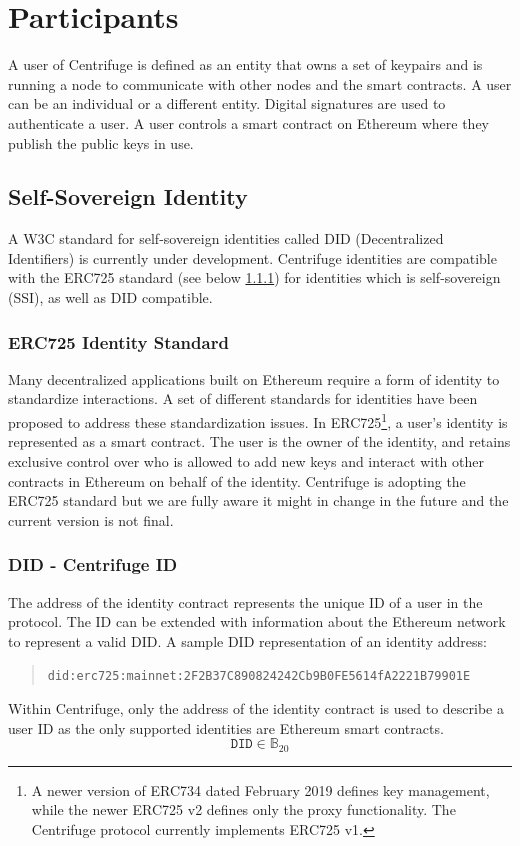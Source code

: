 \section{Participants}\label{sec:particpiants}
A user of Centrifuge is defined as an entity that owns a set of keypairs and is running a node to communicate with other nodes and the smart contracts. A user can be an individual or a different entity. Digital signatures are used to authenticate a user. A user controls a smart contract on Ethereum where they publish the public keys in use.

\subsection{Self-Sovereign Identity}\label{sec:identity_contract}
A W3C standard for self-sovereign identities called DID (Decentralized Identifiers)\cite{Decentra50:online} is currently under development. Centrifuge identities are compatible with the ERC725 standard (see below \ref{sec:erc725}) for identities which is self-sovereign (SSI), as well as DID compatible.

\subsubsection{ERC725 Identity Standard}\label{sec:erc725}
Many decentralized applications built on Ethereum require a form of identity to standardize interactions. A set of different standards for identities have been proposed to address these standardization issues\cite{EIPseip791:online}\cite{ERCLight27:online}. In ERC725\footnote{A newer version of ERC734 dated February 2019 defines key management, while the newer ERC725 v2 defines only the proxy functionality. The Centrifuge protocol currently implements ERC725 v1.}, a user's identity is represented as a smart contract. The user is the owner of the identity, and retains exclusive control over who is allowed to add new keys and interact with other contracts in Ethereum on behalf of the identity. Centrifuge is adopting the ERC725 standard but we are fully aware it might in change in the future and the current version is not final.
\subsubsection{DID - Centrifuge ID}\label{did}
The address of the identity contract represents the unique ID of a user in the protocol. The ID can be extended with information about the Ethereum network to represent a valid DID. A sample DID representation of an identity address\cite{rwot6san30:online}:
\begin{quote}\texttt{did:erc725:mainnet:2F2B37C890824242Cb9B0FE5614fA2221B79901E}\end{quote}
Within Centrifuge, only the address of the identity contract is used to describe a user ID as the only supported identities are Ethereum smart contracts.
\begin{equation}
        \mathtt{DID} \in \mathbb{B}_{20}
\end{equation}
